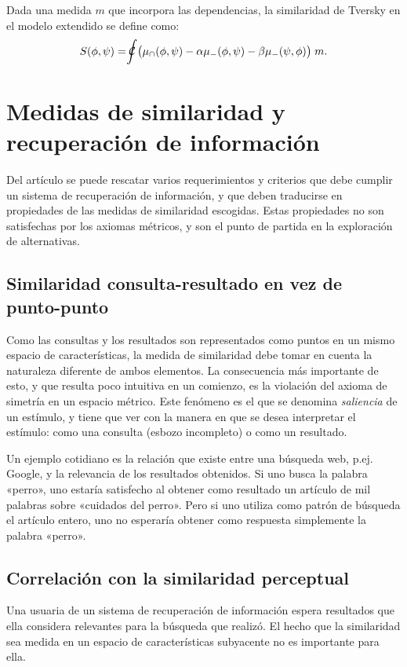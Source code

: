 \documentclass[spanish]{article}
\newcommand{\choquet}{\mathcal{C}\mspace{-18mu}\int}
\begin{document}
Dada una medida $m$ que incorpora las dependencias, la similaridad de Tversky en el modelo extendido
se define como:
\begin{equation}
    S(\phi, \psi) = \choquet\bigl(\mu_\cap (\phi, \psi) -
                            \alpha\mu_-  (\phi, \psi)   -
                            \beta \mu_-  (\psi, \phi)\bigr)\;m.
\end{equation}



\section{Medidas de similaridad y recuperación de información}
Del artículo se puede rescatar varios requerimientos y criterios que debe cumplir un sistema de
recuperación de información, y que deben traducirse en propiedades de las medidas de similaridad
escogidas.  Estas propiedades no son satisfechas por los axiomas métricos, y son el punto de partida
en la exploración de alternativas.

\subsection{Similaridad consulta-resultado en vez de punto-punto}
Como las consultas y los resultados son representados como puntos en un
mismo espacio de características, la medida de similaridad debe tomar en cuenta
la naturaleza diferente de ambos elementos.  La consecuencia más importante de
esto, y que resulta poco intuitiva en un comienzo, es la violación del axioma de
simetría en un espacio métrico.  Este fenómeno es el que se denomina
\emph{saliencia} de un estímulo, y tiene que ver con la manera en que se desea
interpretar el estímulo: como una consulta (esbozo incompleto) o como un resultado.

Un ejemplo cotidiano es la relación que existe entre una búsqueda web, p.ej.
Google, y la relevancia de los resultados obtenidos.  Si uno busca la palabra
«perro», uno estaría satisfecho al obtener como resultado un artículo de mil
palabras sobre «cuidados del perro».  Pero si uno utiliza como patrón de
búsqueda el artículo entero, uno no esperaría obtener como respuesta simplemente
la palabra «perro».

\subsection{Correlación con la similaridad perceptual}
Una usuaria de un sistema de recuperación de información espera resultados
que ella considera relevantes para la búsqueda que realizó.  El hecho que la
similaridad sea medida en un espacio de características subyacente no es
importante para ella.
\end{document}
